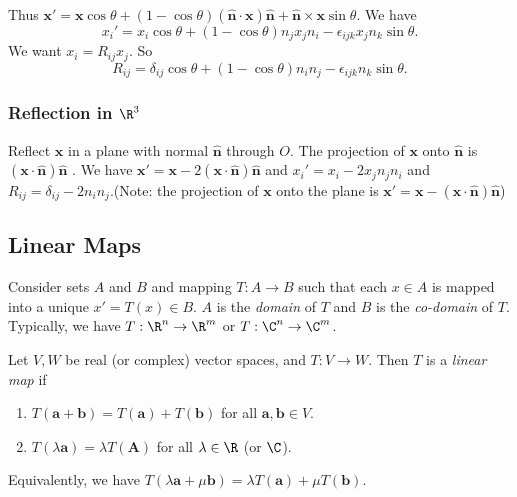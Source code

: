 \documentclass[a4paper]{article}
\begin{document}
Thus $\mathbf{x' = x}\cos\theta + (1 - \cos\theta)\mathbf{(\hat{n}\cdot x)\hat{n} + \hat{n}\times x}\sin\theta$. We have
\[
  x_i' = x_i\cos\theta + (1 - \cos\theta)n_jx_jn_i - \epsilon_{ijk}x_jn_k\sin\theta.
\]
We want $x_i = R_{ij}x_j$. So
\[
  R_{ij} = \delta_{ij}\cos\theta + (1 - \cos\theta)n_in_j - \epsilon_{ijk}n_k\sin\theta.
\]

\subsubsection{Reflection in \texorpdfstring{$\R^3$}{R3}}
Reflect $\mathbf{x}$ in a plane with normal $\mathbf{\hat{n}}$ through $O$. The projection of $\mathbf{x}$ onto $\mathbf{\hat{n}}$ is $\mathbf{(x\cdot \hat{n})\hat{n}}$ . We have $\mathbf{x}' = \mathbf{x} - 2\mathbf{(x\cdot \hat{n})\hat{n}}$ and $x_i' = x_i - 2x_jn_jn_i$ and $R_{ij} = \delta_{ij} - 2n_in_j$.(Note: the projection  of $\mathbf{x}$ onto the plane is $\mathbf{x' = x - (x\cdot \hat{n})\hat{n}}$)

\begin{center}
\end{center}

\subsection{Linear Maps}
\begin{defi}
  Consider sets $A$ and $B$ and mapping $T:A\to B$ such that each $x\in A$ is mapped into a unique $x' = T(x)\in B$. $A$ is the \emph{domain} of $T$ and $B$ is the \emph{co-domain} of $T$. Typically, we have $T:\R^n \to \R^m$ or $T:\C^n\to \C^m$.
\end{defi}

\begin{defi}
  Let $V, W$ be real (or complex) vector spaces, and $T: V\to W$. Then $T$ is a \emph{linear map} if
  \begin{enumerate}
    \item $T(\mathbf{a + b}) = T(\mathbf{a}) + T(\mathbf{b})$ for all $\mathbf{a, b}\in V$.
    \item $T(\lambda\mathbf{a}) = \lambda T(\mathbf{A})$ for all $\lambda \in \R$ (or $\C$).
  \end{enumerate}
  Equivalently, we have $T(\lambda\mathbf{a} + \mu\mathbf{b}) = \lambda T(\mathbf{a}) + \mu T(\mathbf{b})$.
\end{defi}
\end{document}
